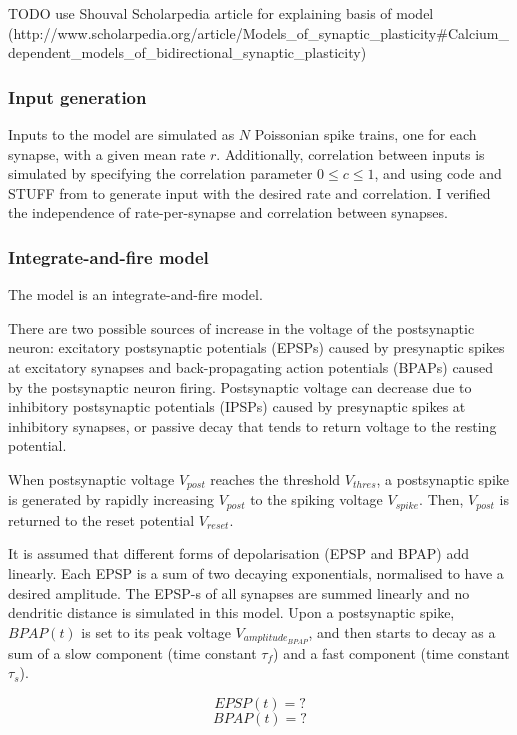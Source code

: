 \documentclass[a4paper,12pt]{report}
\theoremstyle{definition}
\begin{document}
TODO use Shouval Scholarpedia article for explaining basis of model (http://www.scholarpedia.org/article/Models_of_synaptic_plasticity#Calcium_dependent_models_of_bidirectional_synaptic_plasticity)

\subsubsection{Input generation}
Inputs to the model are simulated as $N$ Poissonian spike trains, one for each synapse, with a given mean rate $r$. Additionally, correlation between inputs is simulated by specifying the correlation parameter $0 \leq c \leq 1$, and using code and STUFF from \cite{macke2009} to generate input with the desired rate and correlation. I verified the independence of rate-per-synapse and correlation between synapses.

\subsubsection{Integrate-and-fire model}

The model is an integrate-and-fire model.

There are two possible sources of increase in the voltage of the postsynaptic neuron: excitatory postsynaptic potentials (EPSPs) caused by presynaptic spikes at excitatory synapses and back-propagating action potentials (BPAPs) caused by the postsynaptic neuron firing. Postsynaptic voltage can decrease due to inhibitory postsynaptic potentials (IPSPs) caused by presynaptic spikes at inhibitory synapses, or passive decay that tends to return voltage to the resting potential.

When postsynaptic voltage $V_{post}$ reaches the threshold $V_{thres}$, a postsynaptic spike is generated by rapidly increasing $V_{post}$ to the spiking voltage $V_{spike}$. Then, $V_{post}$ is returned to the reset potential $V_{reset}$.

It is assumed that different forms of depolarisation (EPSP and BPAP) add linearly. 
Each EPSP is a sum of two decaying exponentials, normalised to have a desired amplitude. The EPSP-s of all synapses are summed linearly and no dendritic distance is simulated in this model. Upon a postsynaptic spike, $BPAP(t)$ is set to its peak voltage $V_{amplitude_{BPAP}}$, and then starts to decay as a sum of a slow component (time constant $\tau_f$) and a fast component (time constant $\tau_s$).

$$ EPSP(t) = ? $$
$$ BPAP(t) = ? $$
\end{document}
